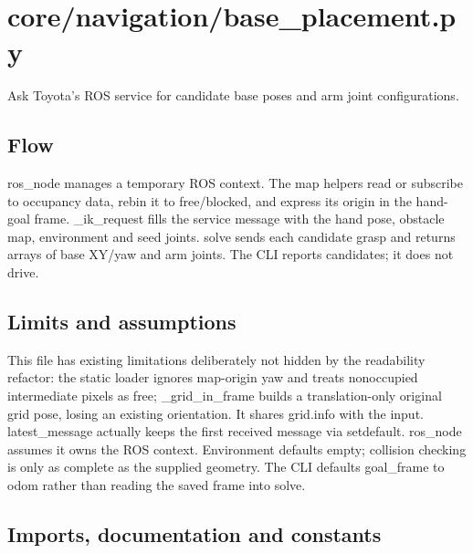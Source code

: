 \documentclass[11pt,a4paper]{book}
\begin{document}
\chapter{core/navigation/base\_placement.py}

Ask Toyota's ROS service for candidate base poses and arm joint configurations.

\section*{Flow}

ros\_node manages a temporary ROS context. The map helpers read or subscribe to occupancy data, rebin it to free/blocked, and express its origin in the hand-goal frame. \_ik\_request fills the service message with the hand pose, obstacle map, environment and seed joints. solve sends each candidate grasp and returns arrays of base XY/yaw and arm joints. The CLI reports candidates; it does not drive.

\section*{Limits and assumptions}

This file has existing limitations deliberately not hidden by the readability refactor: the static loader ignores map-origin yaw and treats nonoccupied intermediate pixels as free; \_grid\_in\_frame builds a translation-only original grid pose, losing an existing orientation. It shares grid.info with the input. latest\_message actually keeps the first received message via setdefault. ros\_node assumes it owns the ROS context. Environment defaults empty; collision checking is only as complete as the supplied geometry. The CLI defaults goal\_frame to odom rather than reading the saved frame into solve.

\section{Imports, documentation and constants}
\end{document}
